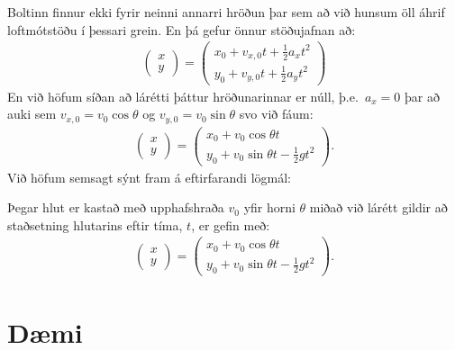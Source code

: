 Boltinn finnur ekki fyrir neinni annarri hröðun þar sem að við hunsum öll áhrif loftmótstöðu í þessari grein. En þá gefur önnur stöðujafnan að:
\begin{align*}
    \begin{pmatrix} x \\ y \end{pmatrix} = \begin{pmatrix} x_0 + v_{x,0}t +  \frac{1}{2} a_x t^2 \\[2pt] y_0 + v_{y,0}t +  \frac{1}{2} a_y t^2 \end{pmatrix}
\end{align*}
En við höfum síðan að lárétti þáttur hröðunarinnar er núll, þ.e.~$a_x = 0$ þar að auki sem $v_{x,0} = v_0 \cos\theta$ og $v_{y,0} = v_0 \sin\theta$ svo við fáum:
\begin{align*}
    \begin{pmatrix} x \\ y \end{pmatrix} = \begin{pmatrix} x_0 + v_0 \cos\theta t \\[2pt] y_0 + v_0 \sin\theta t -  \frac{1}{2} g t^2 \end{pmatrix}.
\end{align*}
Við höfum semsagt sýnt fram á eftirfarandi lögmál:
\begin{tcolorbox}
\begin{theorem}
Þegar hlut er kastað með upphafshraða $v_0$ yfir horni $\theta$ miðað við lárétt gildir að staðsetning hlutarins eftir tíma, $t$, er gefin með:
\begin{align*}
    \begin{pmatrix} x \\ y \end{pmatrix} = \begin{pmatrix} x_0 + v_0 \cos\theta t \\[2pt] y_0 + v_0 \sin\theta t -  \frac{1}{2} g t^2 \end{pmatrix}.
\end{align*}
\end{theorem}
\end{tcolorbox}

\newpage

\section{Dæmi}

